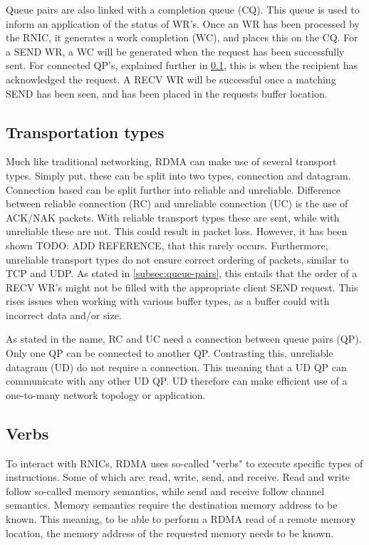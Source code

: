 Queue pairs are also linked with a completion queue (CQ).
This queue is used to inform an application of the status of WR's.
Once an WR has been processed by the RNIC, it generates a work completion (WC), and places this on the CQ.
For a SEND WR, a WC will be generated when the request has been successfully sent.
For connected QP's, explained further in \ref{subsec:transportation-types}, this is when the recipient has acknowledged the request.
A RECV WR will be successful once a matching SEND has been seen, and has been placed in the requests buffer location.

\subsection{Transportation types}\label{subsec:transportation-types}
Much like traditional networking, RDMA can make use of several transport types.
Simply put, these can be split into two types, connection and datagram.
Connection based can be split further into reliable and unreliable.
Difference between reliable connection (RC) and unreliable connection (UC) is the use of ACK/NAK packets.
With reliable transport types these are sent, while with unreliable these are not.
This could result in packet loss.
However, it has been shown TODO: ADD REFERENCE, that this rarely occurs.
Furthermore, unreliable transport types do not ensure correct ordering of packets, similar to TCP and UDP.
As stated in \ref{subsec:queue-pairs}, this entails that the order of a RECV WR's might not be filled with the appropriate client SEND request.
This rises issues when working with various buffer types, as a buffer could with incorrect data and/or size.

As stated in the name, RC and UC need a connection between queue pairs (QP).
Only one QP can be connected to another QP.
Contrasting this, unreliable datagram (UD) do not require a connection.
This meaning that a UD QP can communicate with any other UD QP.
UD therefore can make efficient use of a one-to-many network topology or application.

\subsection{Verbs}\label{subsec:verbs}
To interact with RNICs, RDMA uses so-called "verbs" to execute specific types of instructions.
Some of which are: read, write, send, and receive.
Read and write follow so-called memory semantics, while send and receive follow channel semantics.
Memory semantics require the destination memory address to be known.
This meaning, to be able to perform a RDMA read of a remote memory location, the memory address of the requested memory needs to be known.

